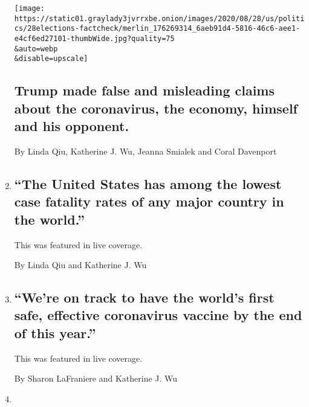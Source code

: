 \begin{enumerate}
  \texttt{[image: https://static01.graylady3jvrrxbe.onion/images/2020/08/28/us/politics/28elections-factcheck/merlin\_176269314\_6aeb91d4-5816-46c6-aee1-e4cf6ed27101-thumbWide.jpg?quality=75\\\&auto=webp\\\&disable=upscale]}

  \hypertarget{trump-made-false-and-misleading-claims-about-the-coronavirus-the-economy-himself-and-his-opponent}{%
  \subsection{Trump made false and misleading claims about the
  coronavirus, the economy, himself and his
  opponent.}\label{trump-made-false-and-misleading-claims-about-the-coronavirus-the-economy-himself-and-his-opponent}}

  By Linda Qiu, Katherine J. Wu, Jeanna Smialek and Coral Davenport
\item
  \href{/live/2020/08/27/us/rnc-fact-check/the-united-states-has-among-the-lowest-case-fatality-rates-of-any-major-country-in-the-world}{}

  \hypertarget{the-united-states-has-among-the-lowest-case-fatality-rates-of-any-major-country-in-the-world}{%
  \subsection{``The United States has among the lowest case fatality
  rates of any major country in the
  world.''}\label{the-united-states-has-among-the-lowest-case-fatality-rates-of-any-major-country-in-the-world}}

  This was featured in live coverage.

  By Linda Qiu and Katherine J. Wu
\item
  \href{/live/2020/08/26/us/rnc-fact-check/were-on-track-to-have-the-worlds-first-safe-effective-coronavirus-vaccine-by-the-end-of-this-year}{}

  \hypertarget{were-on-track-to-have-the-worlds-first-safe-effective-coronavirus-vaccine-by-the-end-of-this-year}{%
  \subsection{``We're on track to have the world's first safe, effective
  coronavirus vaccine by the end of this
  year.''}\label{were-on-track-to-have-the-worlds-first-safe-effective-coronavirus-vaccine-by-the-end-of-this-year}}

  This was featured in live coverage.

  By Sharon LaFraniere and Katherine J. Wu
\item
  \href{/live/2020/08/26/us/rnc-fact-check/no-one-who-required-a-ventilator-was-ever-denied-a-ventilator-in-the-united-states}{}


\end{enumerate}
